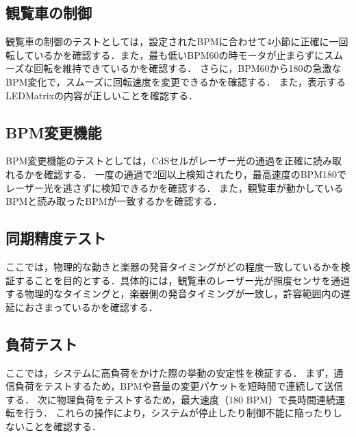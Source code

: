 \documentclass[lualatex,book,paper=a4paper,jafontsize=11.5pt,jafontscale=1.05]{jlreq}
\begin{document}
\subsection{観覧車の制御}
観覧車の制御のテストとしては，設定されたBPMに合わせて4小節に正確に一回転しているかを確認する．また，最も低いBPM60の時モータが止まらずにスムーズな回転を維持できているかを確認する．
さらに，BPM60から180の急激なBPM変化で，スムーズに回転速度を変更できるかを確認する．
また，表示するLEDMatrixの内容が正しいことを確認する．


\subsection{BPM変更機能}
BPM変更機能のテストとしては，CdSセルがレーザー光の通過を正確に読み取れるかを確認する．
一度の通過で2回以上検知されたり，最高速度のBPM180でレーザー光を逃さずに検知できるかを確認する．
また，観覧車が動かしているBPMと読み取ったBPMが一致するかを確認する．


\subsection{同期精度テスト}
ここでは，物理的な動きと楽器の発音タイミングがどの程度一致しているかを検証することを目的とする．具体的には，観覧車のレーザー光が照度センサを通過する物理的なタイミングと，楽器側の発音タイミングが一致し，許容範囲内の遅延におさまっているかを確認する．

\subsection{負荷テスト}
ここでは，システムに高負荷をかけた際の挙動の安定性を検証する．
まず，通信負荷をテストするため，BPMや音量の変更パケットを短時間で連続して送信する．
次に物理負荷をテストするため，最大速度（180 BPM）で長時間連続運転を行う．
これらの操作により，システムが停止したり制御不能に陥ったりしないことを確認する．
\end{document}
